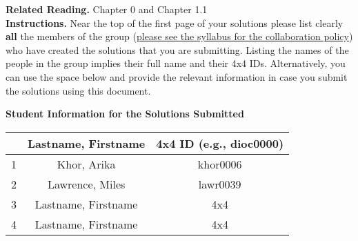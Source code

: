 \noindent\textbf{Related Reading.} Chapter 0 and Chapter 1.1\\
\noindent\textbf{Instructions.} Near the top of the first page of your solutions please list clearly \textbf{all} the members of the group (\underline{please see the syllabus for the collaboration policy}) who have created the solutions that you are submitting. Listing the names of the people in the group implies their full name and their 4x4 IDs.
Alternatively, you can use the space below and provide the relevant information 
in case you submit the solutions using this document.\\ 
\noindent\makebox[\linewidth]{\rule{\columnwidth}{2pt}}


\begin{center}
\textbf{Student Information for the Solutions Submitted}
\end{center}

\begin{center}
\begin{tabular}{c|c|c|}
\cline{2-3}
 & Lastname, Firstname & 4x4 ID (e.g., dioc0000) \\
\hline
\multicolumn{1}{|c|}{1} & Khor, Arika & khor0006 \\
\hline
\multicolumn{1}{|c|}{2} & Lawrence, Miles & lawr0039 \\
\hline
\multicolumn{1}{|c|}{3} & Lastname, Firstname & 4x4 \\
\hline
\multicolumn{1}{|c|}{4} & Lastname, Firstname & 4x4 \\
\hline
\end{tabular}

\end{center}

\thispagestyle{empty}






